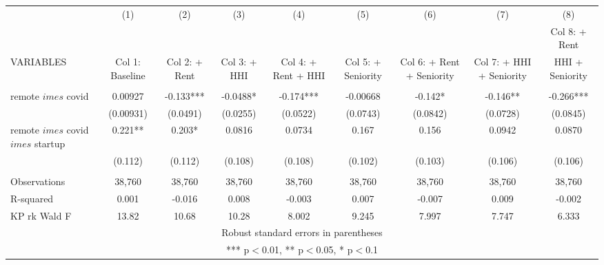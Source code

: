 \documentclass[]{article}
\begin{document}
\begin{tabular}{lcccccccc} \hline
 & (1) & (2) & (3) & (4) & (5) & (6) & (7) & (8) \\
 &  &  &  &  &  &  &  & Col 8: + Rent \\
VARIABLES & Col 1: Baseline & Col 2: + Rent & Col 3: + HHI & Col 4: + Rent + HHI & Col 5: + Seniority & Col 6: + Rent + Seniority & Col 7: + HHI + Seniority & HHI + Seniority \\ \hline
 &  &  &  &  &  &  &  &  \\
remote $	imes$ covid & 0.00927 & -0.133*** & -0.0488* & -0.174*** & -0.00668 & -0.142* & -0.146** & -0.266*** \\
 & (0.00931) & (0.0491) & (0.0255) & (0.0522) & (0.0743) & (0.0842) & (0.0728) & (0.0845) \\
remote $	imes$ covid $	imes$ startup & 0.221** & 0.203* & 0.0816 & 0.0734 & 0.167 & 0.156 & 0.0942 & 0.0870 \\
 & (0.112) & (0.112) & (0.108) & (0.108) & (0.102) & (0.103) & (0.106) & (0.106) \\
 &  &  &  &  &  &  &  &  \\
Observations & 38,760 & 38,760 & 38,760 & 38,760 & 38,760 & 38,760 & 38,760 & 38,760 \\
R-squared & 0.001 & -0.016 & 0.008 & -0.003 & 0.007 & -0.007 & 0.009 & -0.002 \\
 KP rk Wald F & 13.82 & 10.68 & 10.28 & 8.002 & 9.245 & 7.997 & 7.747 & 6.333 \\ \hline
\multicolumn{9}{c}{ Robust standard errors in parentheses} \\
\multicolumn{9}{c}{ *** p$<$0.01, ** p$<$0.05, * p$<$0.1} \\
\end{tabular}
\end{document}
